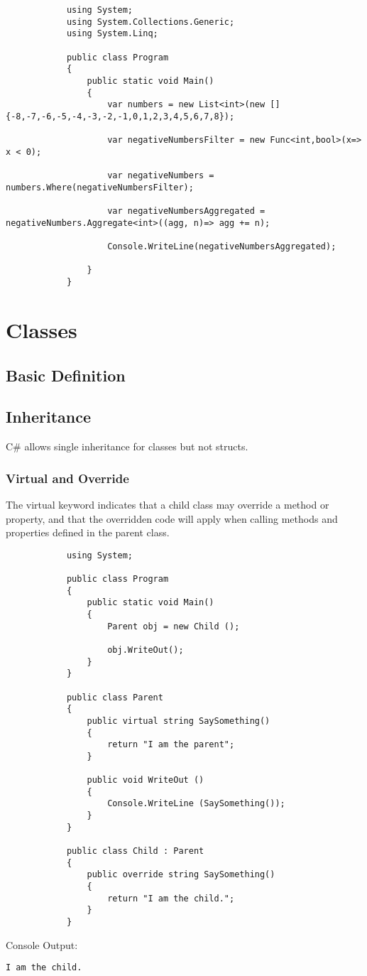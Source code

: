 \documentclass {amsart}
\begin{document}
	\begin{lstlisting}
			using System;
			using System.Collections.Generic;
			using System.Linq;
			
			public class Program
			{
				public static void Main()
				{
					var numbers = new List<int>(new [] {-8,-7,-6,-5,-4,-3,-2,-1,0,1,2,3,4,5,6,7,8});
			
					var negativeNumbersFilter = new Func<int,bool>(x=> x < 0);
			
					var negativeNumbers = numbers.Where(negativeNumbersFilter);
			
					var negativeNumbersAggregated = negativeNumbers.Aggregate<int>((agg, n)=> agg += n);
			
					Console.WriteLine(negativeNumbersAggregated);
					
				}
			}
	\end{lstlisting}



\section{Classes}
	\subsection{Basic Definition}
	\subsection{Inheritance}  C\# allows single inheritance for classes but not structs.  
		\subsubsection{Virtual and Override}  The virtual keyword indicates that a child class may override a method or property, and that the overridden code will apply when calling methods and properties defined in the parent class. 
			\begin{lstlisting}
			using System;
								
			public class Program
			{
				public static void Main()
				{
					Parent obj = new Child ();
					
					obj.WriteOut();
				}
			}

			public class Parent 
			{
				public virtual string SaySomething()
				{
					return "I am the parent";		
				}
				
				public void WriteOut () 
				{
					Console.WriteLine (SaySomething());	
				}
			}

			public class Child : Parent
			{
				public override string SaySomething()
				{
					return "I am the child.";		
				}
			}
			\end{lstlisting}
		Console Output:
		\begin{verbatim}I am the child.\end{verbatim}
\end{document}

